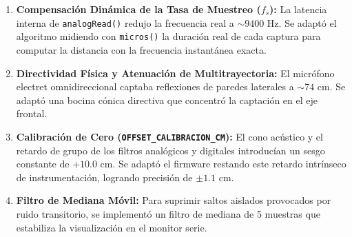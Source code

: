 \documentclass[journal]{IEEEtran}
\begin{document}
\begin{enumerate}
\item \textbf{Compensaci\'on Din\'amica de la Tasa de Muestreo ($f_s$):} La latencia interna de \texttt{analogRead()} redujo la frecuencia real a $\sim 9400\text{ Hz}$. Se adapt\'o el algoritmo midiendo con \texttt{micros()} la duraci\'on real de cada captura para computar la distancia con la frecuencia instant\'anea exacta.
\item \textbf{Directividad F\'isica y Atenuaci\'on de Multitrayectoria:} El micr\'ofono electret omnidireccional captaba reflexiones de paredes laterales a $\sim 74\text{ cm}$. Se adapt\'o una bocina c\'onica directiva que concentr\'o la captaci\'on en el eje frontal.
\item \textbf{Calibraci\'on de Cero (\texttt{OFFSET\_CALIBRACION\_CM}):} El cono ac\'ustico y el retardo de grupo de los filtros anal\'ogicos y digitales introduc\'ian un sesgo constante de $+10.0\text{ cm}$. Se adapt\'o el firmware restando este retardo intr\'inseco de instrumentaci\'on, logrando precisi\'on de $\pm 1.1\text{ cm}$.
\item \textbf{Filtro de Mediana M\'ovil:} Para suprimir saltos aislados provocados por ruido transitorio, se implement\'o un filtro de mediana de 5 muestras que estabiliza la visualizaci\'on en el monitor serie.
\end{enumerate}
\end{document}
